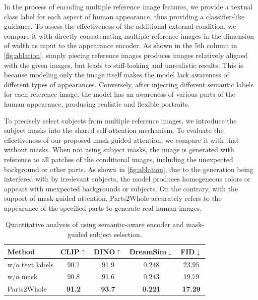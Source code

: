  In the process of encoding multiple reference image features, we provide a textual class label for each aspect of human appearance, thus providing a classifier-like guidance. To assess the effectiveness of the additional external condition, we compare it with directly concatenating multiple reference images in the dimension of width as input to the appearance encoder. As shown in the 5th column in \cref{fig:ablation}, simply piecing reference images produces images relatively aligned with the given images, but leads to stiff-looking and unrealistic results. This is because modeling only the image itself makes the model lack awareness of different types of appearances. Conversely, after injecting different semantic labels for each reference image, the model has an awareness of various parts of the human appearance, producing realistic and flexible portraits.

To precisely select subjects from multiple reference images, we introduce the subject masks into the shared self-attention mechanism. To evaluate the effectiveness of our proposed mask-guided attention, we compare it with that without masks. When not using subject masks, the image is generated with reference to all patches of the conditional images, including the unexpected background or other parts. As shown in \cref{fig:ablation}, due to the generation being interfered with by irrelevant subjects, the model produces homogeneous colors or appears with unexpected backgrounds or subjects. On the contrary, with the support of mask-guided attention, Parts2Whole accurately refers to the appearance of the specified parts to generate real human images.

\begin{table}\small
  \centering
  \caption{Quantitative analysis of using semantic-aware encoder and mask-guided subject selection.}
  \begin{tabular}{@{}lcccc@{}}
    \toprule
    Method & CLIP$\uparrow$ & DINO$\uparrow$ & DreamSim\cite{fu2023dreamsim}$\downarrow$ & FID$\downarrow$ \\
    \midrule
    w/o text labels & 90.1 & 91.9 & 0.248 & 23.95 \\
    w/o mask & 90.8 & 91.6 & 0.243 & 19.79 \\
   Parts2Whole & \textbf{91.2} & \textbf{93.7} & \textbf{0.221} & \textbf{17.29} \\
    \bottomrule
  \end{tabular}
  \label{tab:abla}
\end{table}

